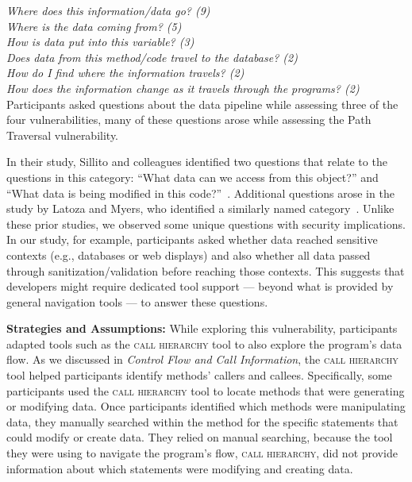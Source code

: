 \documentclass[10pt,journal,compsoc]{IEEEtran}
\begin{document}
\noindent\emph{Where does this information/data go? (9)} \\
\emph{Where is the data coming from? (5)} \\
\emph{How is data put into this variable? (3)} \\
\emph{Does data from this method/code travel to the database? (2)} \\
\emph{How do I find where the information travels? (2)} \\
\emph{How does the information change as it travels through the programs? (2)} 
\\

 
Participants asked questions about the data pipeline while assessing three of the four vulnerabilities, many of these questions arose while assessing the Path Traversal vulnerability. 

In their study, Sillito and colleagues identified two questions that relate to the questions in this category:
``What data can we access from this object?'' and
``What data is being modified in this code?''~\cite{sillito2008asking}.
Additional questions arose in the study by Latoza and Myers, who identified a similarly named category~\cite{latoza2010hard}.
Unlike these prior studies, we observed some unique questions with security implications. 
In our study, for example, participants asked whether data reached sensitive contexts (e.g., databases or web displays) and also whether all data passed through sanitization/validation before reaching those contexts.
This suggests that developers might require dedicated tool support --- beyond what is provided by general navigation tools --- to answer these questions.

\textbf{Strategies and Assumptions:}
While exploring this vulnerability, participants adapted tools such as the \textsc{call hierarchy} tool to also explore the program's data flow. 
As we discussed in \emph{Control Flow and Call Information}, the \textsc{call hierarchy} tool helped participants identify methods' callers and callees.
Specifically, some participants used the \textsc{call hierarchy} tool to locate methods that were generating or modifying data.
Once participants identified which methods were manipulating data, they manually searched within the method for the specific statements that could modify or create data.
They relied on manual searching, because the tool they were using to navigate the program's flow, \textsc{call hierarchy}, did not provide information about which statements were modifying and creating data.
\end{document}
